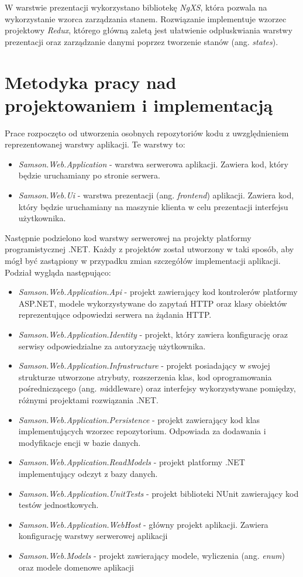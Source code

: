 \documentclass[a4paper,twoside,12pt]{book}
\newcommand{\obcy}[1]{\emph{#1}}
\newcommand{\ang}[1]{{\selectlanguage{british}\obcy{#1}}}
\begin{document}
{	W warstwie prezentacji wykorzystano bibliotekę \textit{NgXS}, która pozwala na wykorzystanie wzorca zarządzania stanem. Rozwiązanie implementuje wzorzec projektowy \textit{Redux}, którego główną zaletą jest ułatwienie odpluskwiania warstwy prezentacji oraz zarządzanie danymi poprzez tworzenie stanów (ang. \ang{states}).
	
	\section {Metodyka pracy nad projektowaniem i implementacją}
	
	Prace rozpoczęto od utworzenia osobnych repozytoriów kodu z uwzględnieniem reprezentowanej warstwy aplikacji. Te warstwy to:
	\begin{itemize}
		\item \textit{Samson.Web.Application} - warstwa serwerowa aplikacji. Zawiera kod, który będzie uruchamiany po stronie serwera.
		\item \textit{Samson.Web.Ui} - warstwa prezentacji (ang. \ang{frontend}) aplikacji. Zawiera kod, który będzie uruchamiany na maszynie klienta w celu prezentacji interfejsu użytkownika.
	\end{itemize}

	Następnie podzielono kod warstwy serwerowej na projekty platformy programistycznej .NET. Każdy z projektów został utworzony w taki sposób, aby mógł być zastąpiony w przypadku zmian szczegółów implementacji aplikacji. Podział wygląda następująco:
	\begin{itemize}
		\item \textit{Samson.Web.Application.Api} - projekt zawierający kod kontrolerów platformy ASP.NET, modele wykorzystywane do zapytań HTTP oraz klasy obiektów reprezentujące odpowiedzi serwera na żądania HTTP.
		\item \textit{Samson.Web.Application.Identity} - projekt, który zawiera konfigurację oraz serwisy odpowiedzialne za autoryzację użytkownika.
		\item \textit{Samson.Web.Application.Infrastructure} - projekt posiadający w swojej strukturze utworzone atrybuty, rozszerzenia klas, kod oprogramowania pośredniczącego (ang. \ang middleware) oraz interfejsy wykorzystywane pomiędzy, różnymi projektami rozwiązania .NET.
		\item \textit{Samson.Web.Application.Persistence} - projekt zawierający kod klas implementujących wzorzec repozytorium. Odpowiada za dodawania i modyfikacje encji w bazie danych.
		\item \textit{Samson.Web.Application.ReadModels} - projekt platformy .NET implementujący odczyt z bazy danych.
		\item \textit{Samson.Web.Application.UnitTests} - projekt biblioteki NUnit zawierający kod testów jednostkowych.
		\item \textit{Samson.Web.Application.WebHost} - główny projekt aplikacji. Zawiera konfigurację warstwy serwerowej aplikacji
		\item \textit{Samson.Web.Models} - projekt zawierający modele, wyliczenia (ang. \ang{enum}) oraz modele domenowe aplikacji
	\end{itemize}
	
}
\end{document}
